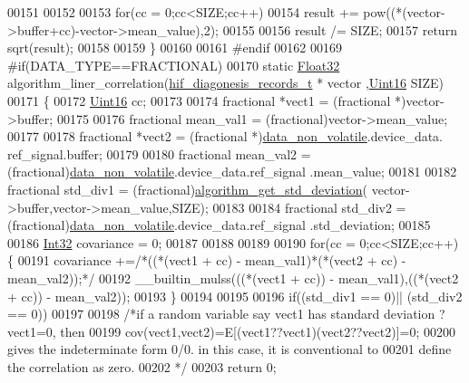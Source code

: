 \begin{DoxyCode}
00151 
00152 
00153     \textcolor{keywordflow}{for}(cc = 0;cc<SIZE;cc++)
00154         result += pow((*(vector->buffer+cc)-vector->mean\_value),2);
00155 
00156     result /= SIZE;
00157     \textcolor{keywordflow}{return} sqrt(result);
00158 
00159 \}
00160 
00161 \textcolor{preprocessor}{#endif}
00162 
00169 \textcolor{preprocessor}{#if(DATA\_TYPE==FRACTIONAL)}
00170 \textcolor{keyword}{static} \hyperlink{a00072_a87d38f886e617ced2698fc55afa07637}{Float32} algorithm\_liner\_correlation(\hyperlink{a00022_a4726b814166e222a6f13e21453f76d8d}{hif\_diagonesis\_records\_t} * vector
      ,\hyperlink{a00072_a59a9f6be4562c327cbfb4f7e8e18f08b}{Uint16} SIZE)
00171 \{
00172     \hyperlink{a00072_a59a9f6be4562c327cbfb4f7e8e18f08b}{Uint16} cc;
00173 
00174     fractional *vect1               = (fractional *)vector->buffer;
00175 
00176     fractional  mean\_val1           = (fractional)vector->mean\_value;
00177 
00178     fractional *vect2               = (fractional *)\hyperlink{a00060_a76ac5f917f5308dcd83de0d7c94559fb}{data\_non\_volatile}.device\_data.
      ref\_signal.buffer;
00179 
00180     fractional  mean\_val2           = (fractional)\hyperlink{a00060_a76ac5f917f5308dcd83de0d7c94559fb}{data\_non\_volatile}.device\_data.ref\_signal
      .mean\_value;
00181 
00182     fractional std\_div1             = (fractional)\hyperlink{a00038_a97eb6437dda088f144d791e49cd3dc2a}{algorithm\_get\_std\_deviation}(
      vector->buffer,vector->mean\_value,SIZE);
00183 
00184     fractional std\_div2             = (fractional)\hyperlink{a00060_a76ac5f917f5308dcd83de0d7c94559fb}{data\_non\_volatile}.device\_data.ref\_signal
      .std\_deviation;
00185 
00186     \hyperlink{a00072_a184d0ff2424cf4b81c68ce9538481a04}{Int32}  covariance                = 0;
00187 
00188 
00189 
00190     \textcolor{keywordflow}{for}(cc = 0;cc<SIZE;cc++)\{
00191         covariance +=\textcolor{comment}{/*((*(vect1 + cc) - mean\_val1)*(*(vect2 + cc) - mean\_val2));*/}
00192                      \_\_builtin\_mulss(((*(vect1 + cc)) - mean\_val1),((*(vect2 + cc)) - mean\_val2));
00193     \}
00194 
00195 
00196     \textcolor{keywordflow}{if}((std\_div1 == 0)|| (std\_div2 == 0))
00197 
00198     \textcolor{comment}{/*if a random variable say vect1 has standard deviation ?vect1=0, then}
00199 \textcolor{comment}{    cov(vect1,vect2)=E[(vect1??vect1)(vect2??vect2)]=0;}
00200 \textcolor{comment}{    gives the indeterminate form 0/0. in this case, it is conventional to}
00201 \textcolor{comment}{    define the correlation as zero.}
00202 \textcolor{comment}{     */}
00203     \textcolor{keywordflow}{return} 0;

\end{DoxyCode}
